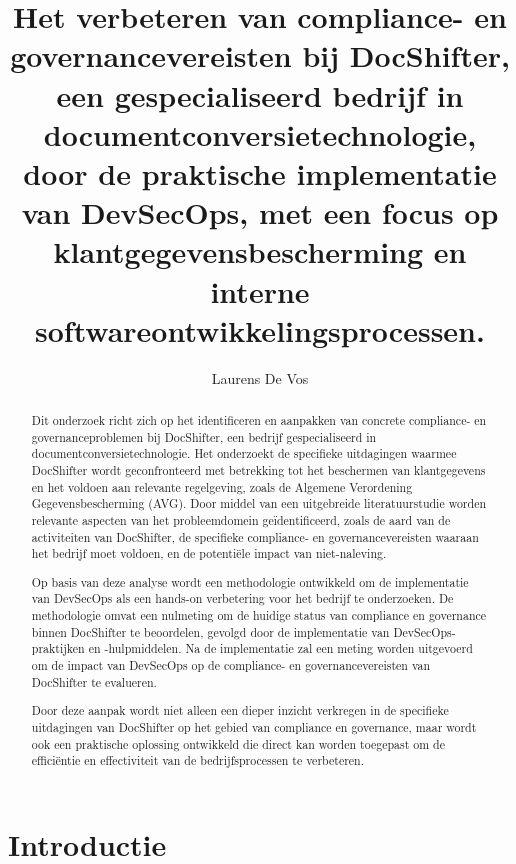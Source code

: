 \documentclass{hogent-article}
\title{Het verbeteren van compliance- en governancevereisten bij DocShifter, een gespecialiseerd bedrijf in documentconversietechnologie, door de praktische implementatie van DevSecOps, met een focus op klantgegevensbescherming en interne softwareontwikkelingsprocessen.}
\author{Laurens De Vos}
\begin{document}
    
    \begin{abstract}
    Dit onderzoek richt zich op het identificeren en aanpakken van concrete compliance- en governanceproblemen bij DocShifter, een bedrijf gespecialiseerd in documentconversietechnologie. Het onderzoekt de specifieke uitdagingen waarmee DocShifter wordt geconfronteerd met betrekking tot het beschermen van klantgegevens en het voldoen aan relevante regelgeving, zoals de Algemene Verordening Gegevensbescherming (AVG). Door middel van een uitgebreide literatuurstudie worden relevante aspecten van het probleemdomein geïdentificeerd, zoals de aard van de activiteiten van DocShifter, de specifieke compliance- en governancevereisten waaraan het bedrijf moet voldoen, en de potentiële impact van niet-naleving.
    
    Op basis van deze analyse wordt een methodologie ontwikkeld om de implementatie van DevSecOps als een hands-on verbetering voor het bedrijf te onderzoeken. De methodologie omvat een nulmeting om de huidige status van compliance en governance binnen DocShifter te beoordelen, gevolgd door de implementatie van DevSecOps-praktijken en -hulpmiddelen. Na de implementatie zal een meting worden uitgevoerd om de impact van DevSecOps op de compliance- en governancevereisten van DocShifter te evalueren.
    
    Door deze aanpak wordt niet alleen een dieper inzicht verkregen in de specifieke uitdagingen van DocShifter op het gebied van compliance en governance, maar wordt ook een praktische oplossing ontwikkeld die direct kan worden toegepast om de efficiëntie en effectiviteit van de bedrijfsprocessen te verbeteren. 
    
    \end{abstract}
    
    \tableofcontents
    
    
    \section{Introductie}%
    \label{sec:introductie}
    
\end{document}
